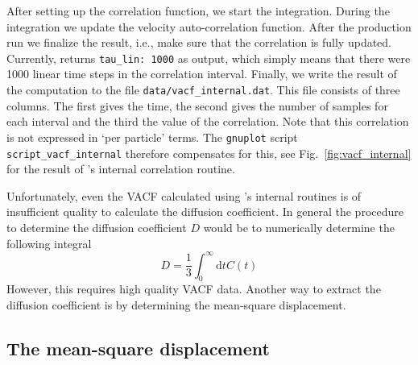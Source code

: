 \documentclass[
paper=a4,                       %
fontsize=11pt,                  %
twoside,                        %
footsepline,                    %
headsepline,                    %
headinclude=false,              %
footinclude=false,              %
pagesize,                       %
]{scrartcl}
\newtheorem{task}{Task}
\begin{document}
\noindent After setting up the correlation function, we start the integration. During the integration we update the velocity auto-correlation function. After the production run we finalize the result, i.e., make sure that the correlation is fully updated. Currently, \es{} returns \texttt{tau\_lin: 1000} as output, which simply means that there were 1000 linear time steps in the correlation interval. Finally, we write the result of the computation to the file \texttt{data/vacf\_internal.dat}. This file consists of three columns. The first gives the time, the second gives the number of samples for each interval and the third the value of the correlation. Note that this correlation is not expressed in `per particle' terms. The \texttt{gnuplot} script \texttt{script\_vacf\_internal} therefore compensates for this, see Fig.~\ref{fig:vacf_internal} for the result of \es{}'s internal correlation routine. 

\noindent Unfortunately, even the VACF calculated using \es{}'s internal routines is of insufficient quality to calculate the diffusion coefficient. In general the procedure to determine the diffusion coefficient $D$ would be to numerically determine the following integral
\begin{equation}
\label{eq:diff} D  = \frac{1}{3} \int_{0}^{\infty} \mathrm{d}t C(t) 
\end{equation}
However, this requires high quality VACF data. Another way to extract the diffusion coefficient is by determining the mean-square displacement.

\subsection{The mean-square displacement}

\vspace{1cm}
\vspace{1cm}
\end{document}
